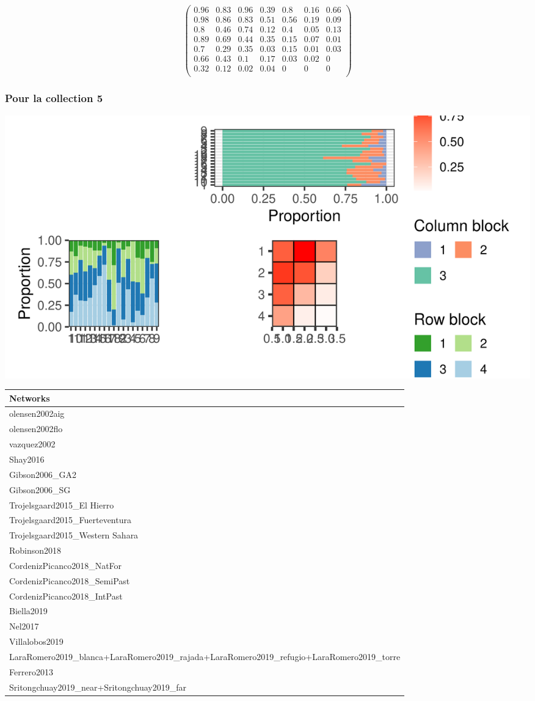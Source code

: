\normalsize\newline\[\begin{pmatrix} 0.96 &0.83 &0.96 &0.39 &0.8 &0.16 &0.66 \\0.98 &0.86 &0.83 &0.51 &0.56 &0.19 &0.09 \\0.8 &0.46 &0.74 &0.12 &0.4 &0.05 &0.13 \\0.89 &0.69 &0.44 &0.35 &0.15 &0.07 &0.01 \\0.7 &0.29 &0.35 &0.03 &0.15 &0.01 &0.03 \\0.66 &0.43 &0.1 &0.17 &0.03 &0.02 &0 \\0.32 &0.12 &0.02 &0.04 &0 &0 &0 \\ \end{pmatrix}\]

\subsubsection{Pour la collection 5 }

\includegraphics{./img/be6eb1cef4cfa33f60e7f12e0d81b62fb4805328.png}\newline \tiny

\begin{tabular}{l}
\toprule
Networks\\
\midrule
olensen2002aig\\
olensen2002flo\\
vazquez2002\\
Shay2016\\
Gibson2006\_GA2\\
\addlinespace
Gibson2006\_SG\\
Trojelsgaard2015\_El Hierro\\
Trojelsgaard2015\_Fuerteventura\\
Trojelsgaard2015\_Western Sahara\\
Robinson2018\\
\addlinespace
CordenizPicanco2018\_NatFor\\
CordenizPicanco2018\_SemiPast\\
CordenizPicanco2018\_IntPast\\
Biella2019\\
Nel2017\\
\addlinespace
Villalobos2019\\
LaraRomero2019\_blanca+LaraRomero2019\_rajada+LaraRomero2019\_refugio+LaraRomero2019\_torre\\
Ferrero2013\\
Sritongchuay2019\_near+Sritongchuay2019\_far\\
\bottomrule
\end{tabular}

